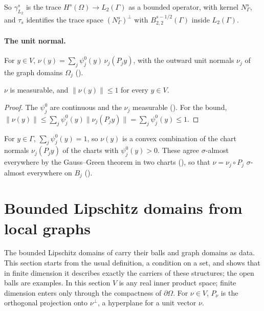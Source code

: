 So $\gamma^s_{L_2}$ is the trace $H^s(\Omega) \to L_2(\Gamma)$ as a bounded operator, with
kernel $N^s_\Gamma$, and $\tau_s$ identifies the trace space $(N^s_\Gamma)^\perp$ with
$B^{s-1/2}_{2,2}(\Gamma)$ inside $L_2(\Gamma)$.

\paragraph{The unit normal.}

\begin{definition}
\label{def:boundary-normal}
\leanok
{}
For $y \in V$, $\nu(y) = \sum_j \psi^0_j(y) \, \nu_j(P_j y)$, with the outward unit normals
$\nu_j$ of the graph domains $\Omega_j$ ().
\end{definition}

\begin{lemma}
\label{lem:boundary-normal}
\leanok
{}
$\nu$ is measurable, and $\|\nu(y)\| \leq 1$ for every $y \in V$.
\end{lemma}

\begin{proof}
\leanok
The $\psi^0_j$ are continuous and the $\nu_j$ measurable (). For the bound,
$\|\nu(y)\| \leq \sum_j \psi^0_j(y) \|\nu_j(P_j y)\| = \sum_j \psi^0_j(y) \leq 1$.
\end{proof}

For $y \in \Gamma$, $\sum_j \psi^0_j(y) = 1$, so $\nu(y)$ is a convex combination of the chart
normals $\nu_j(P_j y)$ of the charts with $\psi^0_j(y) > 0$. These agree $\sigma$-almost
everywhere by the Gauss--Green theorem in two charts (), so that
$\nu = \nu_j \circ P_j$ $\sigma$-almost everywhere on $B_j$ ().

\section{Bounded Lipschitz domains from local graphs}
\label{sec:local-lipschitz-graphs}

The bounded Lipschitz domains of  carry their balls and graph domains
as data. This section starts from the usual definition, a condition on a set, and shows that in
finite dimension it describes exactly the carriers of these structures; the open balls are
examples. In this section $V$ is any real inner product space; finite dimension enters only
through the compactness of $\partial\Omega$. For $\nu \in V$, $P_\nu$ is the orthogonal
projection onto $\nu^\perp$, a hyperplane for a unit vector $\nu$.

